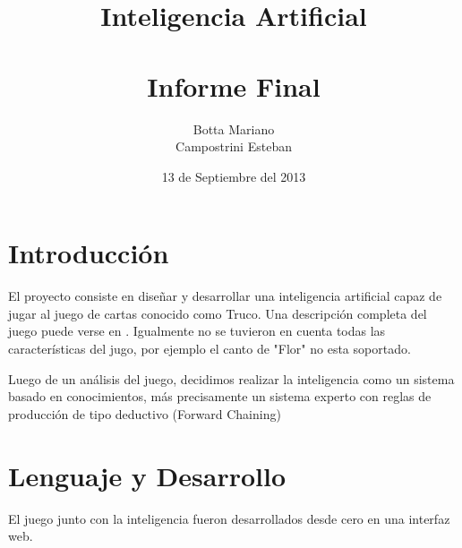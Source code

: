 \documentclass[12pt,a4paper]{article}
\title{Inteligencia Artificial\\
\\ 
\large Informe Final
}
\author{Botta Mariano \\ Campostrini Esteban}
\date{ \small 13 de Septiembre del 2013}
\begin{document}
\maketitle 
\section{Introducci\'on}
El proyecto consiste en diseñar y desarrollar una inteligencia artificial capaz de jugar al juego de cartas conocido como Truco.
Una descripci\'on completa del juego puede verse en \cite{reglas}. Igualmente no se tuvieron en cuenta todas las caracter\'isticas del jugo, por ejemplo el canto de "Flor" no esta soportado. 

Luego de un an\'alisis del juego, decidimos realizar la inteligencia como un sistema basado en conocimientos, más precisamente un sistema experto con reglas de producción de tipo deductivo (Forward Chaining)

\section{Lenguaje y Desarrollo}
El juego junto con la inteligencia fueron desarrollados desde cero en una interfaz web. 
\end{document}
